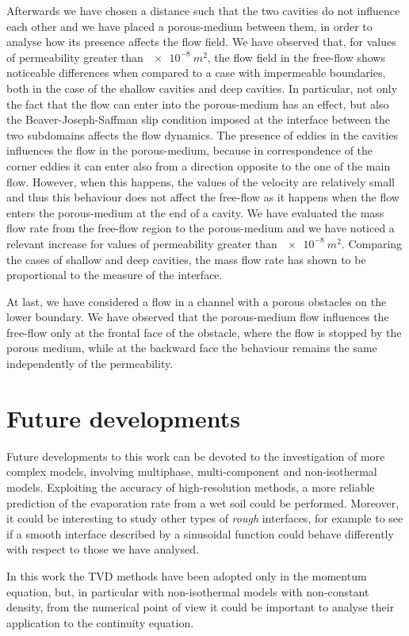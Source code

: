 Afterwards we have chosen a distance such that the two cavities do not 
influence each other and we have placed a porous-medium between them, in order 
to analyse how its presence affects the flow field. We have observed that, 
for values of permeability greater than $\SI{e-8}{m^2}$, the flow field in the 
free-flow shows noticeable differences when compared to a case with impermeable boundaries, both in the case of the shallow cavities and deep cavities.
In particular, not only the fact that the flow can enter into 
the porous-medium has an effect, but also the Beaver-Joseph-Saffman slip 
condition imposed at the interface between the two subdomains affects the flow dynamics.
The presence of eddies in the cavities influences the flow in the 
porous-medium, because in correspondence of the corner eddies it can enter also 
from a direction opposite to the one of the main flow. However, when this 
happens, the values of the velocity are relatively small and thus this 
behaviour does not affect the free-flow as it happens when the flow enters the 
porous-medium at the end of a cavity. We have evaluated the mass flow 
rate from the free-flow region to the porous-medium and we have noticed a 
relevant 
increase for values of permeability greater than $\SI{e-8}{m^2}$. Comparing 
the cases of shallow and deep cavities, the mass flow rate has shown to be 
proportional to the measure of the interface.

At last, we have considered a flow in a channel with a porous obstacles on the 
lower boundary. We have observed that the porous-medium flow influences the 
free-flow only at the frontal face of the obstacle, where the flow is stopped 
by the porous medium, while at the backward face the behaviour remains the same 
independently of the permeability.
%
\section{Future developments}
Future developments to this work can be devoted to the investigation of more 
complex models, involving multiphase, multi-component and non-isothermal 
models. Exploiting the accuracy of high-resolution methods, a more reliable 
prediction of the evaporation rate from a wet soil could be performed. 
Moreover, it could be interesting to study other types of \emph{rough} 
interfaces, for example to see if a smooth interface described by a sinusoidal 
function could behave differently with respect to those we have analysed.

In this work the TVD methods have been adopted only in the momentum equation, 
but, in particular with non-isothermal models with non-constant density, from 
the numerical point of view it could be important to analyse their 
application to the continuity equation.

